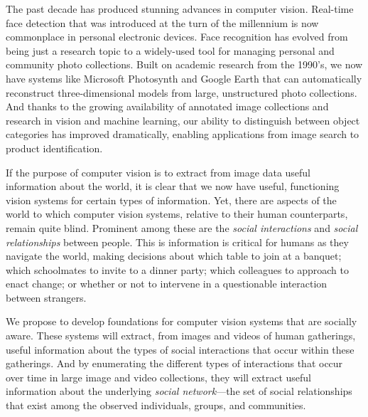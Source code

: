 \pagestyle{plain} 

\begin{center}
{\Large{\bf \mytitle}}
\end{center}
\vspace{-0.1in}

\label{sec:intro}


The past decade has produced stunning advances in computer vision. Real-time face detection that was introduced at the turn of the millennium is now commonplace in personal electronic devices. Face recognition has evolved from being just a research topic to a widely-used tool for managing personal and community photo collections. Built on academic research from the 1990's, we now have systems like Microsoft Photosynth and Google Earth that can automatically reconstruct three-dimensional models from large, unstructured photo collections. And thanks to the growing availability of annotated image collections and research in vision and machine learning, our ability to distinguish between object categories has improved dramatically, enabling applications from image search to product identification.

If the purpose of computer vision is to extract from image data useful information about the world, it is clear that we now have useful, functioning vision systems for certain types of information. Yet, there are aspects of the world to which computer vision systems, relative to their human counterparts, remain quite blind. Prominent among these are the \emph{social interactions} and \emph{social relationships} between people. This is information is critical for humans as they navigate the world, making decisions about which table to join at a banquet; which schoolmates to invite to a dinner party; which colleagues to approach to enact change; or whether or not to intervene in a questionable interaction between strangers.

We propose to develop foundations for computer vision systems that are socially aware. These systems will extract, from images and videos of human gatherings, useful information about the types of social interactions that occur within these gatherings. And by enumerating the different types of interactions that occur over time in large image and video collections, they will extract useful information about the underlying \emph{social network}---the set of social relationships that exist among the observed individuals, groups, and communities.

